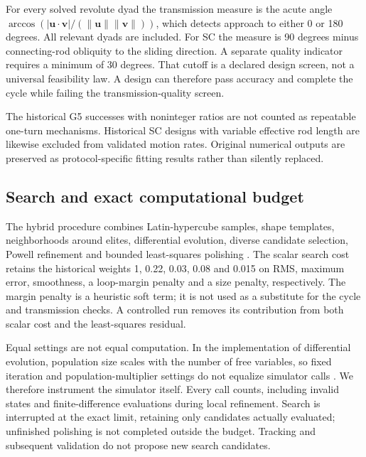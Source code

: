 \documentclass[applsci,article,submit,pdftex,moreauthors]{Definitions/mdpi}
\begin{document}
For every solved revolute dyad the transmission measure is the acute angle $\arccos(|\mathbf u\cdot\mathbf v|/(\|\mathbf u\|\|\mathbf v\|))$, which detects approach to either 0 or 180 degrees. All relevant dyads are included. For SC the measure is 90 degrees minus connecting-rod obliquity to the sliding direction. A separate quality indicator requires a minimum of 30 degrees. That cutoff is a declared design screen, not a universal feasibility law. A design can therefore pass accuracy and complete the cycle while failing the transmission-quality screen.

The historical G5 successes with noninteger ratios are not counted as repeatable one-turn mechanisms. Historical SC designs with variable effective rod length are likewise excluded from validated motion rates. Original numerical outputs are preserved as protocol-specific fitting results rather than silently replaced.

\subsection{Search and exact computational budget}\label{sec:search}
The hybrid procedure combines Latin-hypercube samples, shape templates, neighborhoods around elites, differential evolution, diverse candidate selection, Powell refinement and bounded least-squares polishing \cite{Storn1997,Virtanen2020}. The scalar search cost retains the historical weights 1, 0.22, 0.03, 0.08 and 0.015 on RMS, maximum error, smoothness, a loop-margin penalty and a size penalty, respectively. The margin penalty is a heuristic soft term; it is not used as a substitute for the cycle and transmission checks. A controlled run removes its contribution from both scalar cost and the least-squares residual.

Equal settings are not equal computation. In the implementation of differential evolution, population size scales with the number of free variables, so fixed iteration and population-multiplier settings do not equalize simulator calls \cite{SciPyDE}. We therefore instrument the simulator itself. Every call counts, including invalid states and finite-difference evaluations during local refinement. Search is interrupted at the exact limit, retaining only candidates actually evaluated; unfinished polishing is not completed outside the budget. Tracking and subsequent validation do not propose new search candidates.
\end{document}
